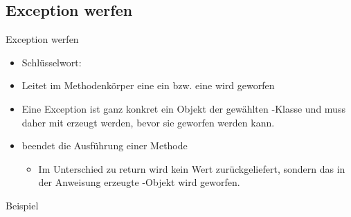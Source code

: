 \documentclass{../tuda-beamer}
\begin{document}
    \subsection{Exception werfen}
    \label{subsec:exception-werfen}
    \begin{frame}[c]{Exception werfen}
        \begin{itemize}
            \item Schlüsselwort: 
            \item Leitet im Methodenkörper eine  ein bzw. eine
             wird geworfen
            \item Eine Exception ist ganz konkret ein Objekt der gewählten
            -Klasse und muss daher mit  erzeugt werden,
            bevor sie geworfen werden kann.
            \item {} beendet die Ausführung einer Methode
            \begin{itemize}
                \item Im Unterschied zu return wird kein Wert zurückgeliefert, sondern das in der
                Anweisung erzeugte -Objekt wird geworfen.
            \end{itemize}
        \end{itemize}
    \end{frame}

    \begin{frame}[c]{Beispiel}
        
    \end{frame}
\end{document}
